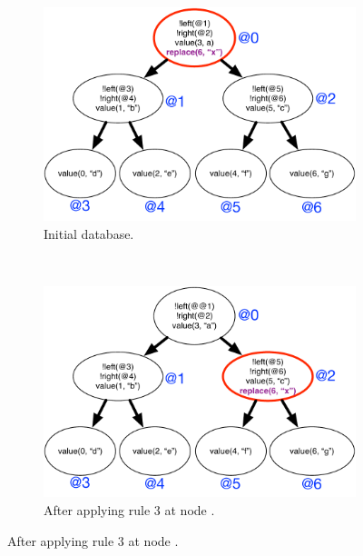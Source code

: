 \begin{figure}[h]
        \centering
        \begin{subfigure}[b]{0.5\textwidth}
                \includegraphics[width=\textwidth]{figures/btree/btree_trace1}
                \caption{Initial database.}
                \label{fig:language:btree_trace1}
        \end{subfigure}%
        ~
        \begin{subfigure}[b]{0.5\textwidth}
                \includegraphics[width=\textwidth]{figures/btree/btree_trace2}

                \caption{After applying rule 3 at node .}


\end{subfigure}
\end{figure}
